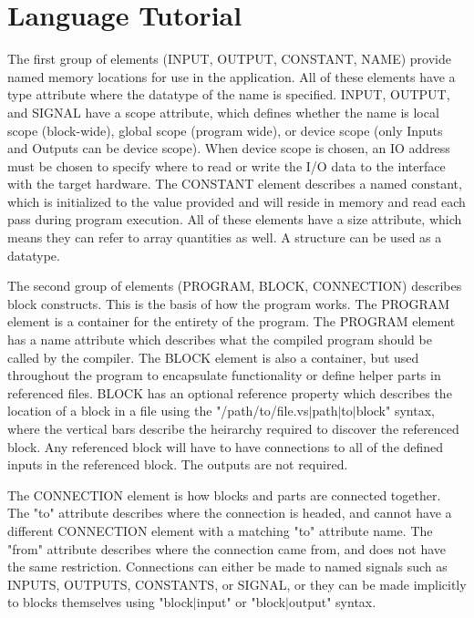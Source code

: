 \section{Language Tutorial}

The first group of elements (INPUT, OUTPUT, CONSTANT, NAME) provide named
memory locations for use in the application. All of these elements have a
type attribute where the datatype of the name is specified. INPUT, OUTPUT,
and SIGNAL have a scope attribute, which defines whether the name is local
scope (block-wide), global scope (program wide), or device scope (only
Inputs and Outputs can be device scope). When device scope is chosen, an
IO address must be chosen to specify where to read or write the I/O data
to the interface with the target hardware. The CONSTANT element describes
a named constant, which is initialized to the value provided and will reside
in memory and read each pass during program execution. All of these
elements have a size attribute, which means they can refer to array quantities
as well. A structure can be used as a datatype.

The second group of elements (PROGRAM, BLOCK, CONNECTION) describes block
constructs. This is the basis of how the program works. The PROGRAM element
is a container for the entirety of the program. The PROGRAM element has a
name attribute which describes what the compiled program should be
called by the compiler. The BLOCK element is also a container, but used
throughout the program to encapsulate functionality or define helper parts
in referenced files. BLOCK has an optional reference property which describes
the location of a block in a file using the "/path/to/file.vs$\vert$path$\vert$to$\vert$block"
syntax, where the vertical bars describe the heirarchy required to discover
the referenced block. Any referenced block will have to have connections to 
all of the defined inputs in the referenced block. The outputs are not
required.

The CONNECTION element is how blocks and parts are connected
together. The "to" attribute describes where the connection is headed, and
cannot have a different CONNECTION element with a matching "to" attribute
name. The "from" attribute describes where the connection came from, and
does not have the same restriction. Connections can either be made to named
signals such as INPUTS, OUTPUTS, CONSTANTS, or SIGNAL, or they can be made
implicitly to blocks themselves using "block$\vert$input" or "block$\vert$output" syntax.

